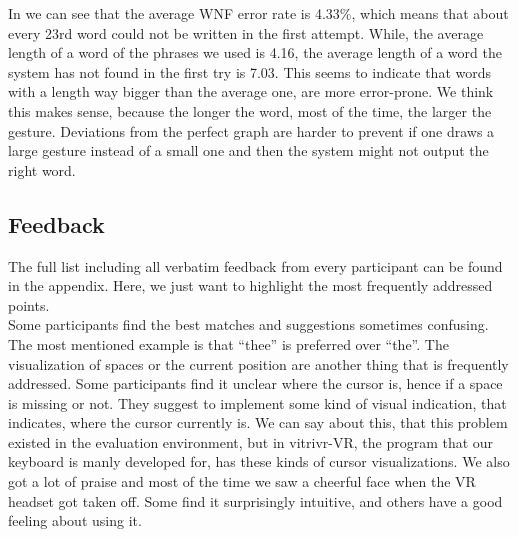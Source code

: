 In  we can see that the average WNF error rate is 4.33\%, which means that about every 23rd word could not be written in the first attempt. While, the average length of a word of the phrases we used is 4.16, the average length of a word the system has not found in the first try is 7.03. This seems to indicate that words with a length way bigger than the average one, are more error-prone. We think this makes sense, because the longer the word, most of the time, the larger the gesture. Deviations from the perfect graph are harder to prevent if one draws a large gesture instead of a small one and then the system might not output the right word.

\subsection{Feedback}
The full list including all verbatim feedback from every participant can be found in the appendix. Here, we just want to highlight the most frequently addressed points.\\
Some participants find the best matches and suggestions sometimes confusing. The most mentioned example is that ``thee'' is preferred over ``the''. The visualization of spaces or the current position are another thing that is frequently addressed. Some participants find it unclear where the cursor is, hence if a space is missing or not. They suggest to implement some kind of visual indication, that indicates, where the cursor currently is. We can say about this, that this problem existed in the evaluation environment, but in vitrivr-VR, the program that our keyboard is manly developed for, has these kinds of cursor visualizations. We also got a lot of praise and most of the time we saw a cheerful face when the VR headset got taken off. Some find it surprisingly intuitive, and others have a good feeling about using it.

